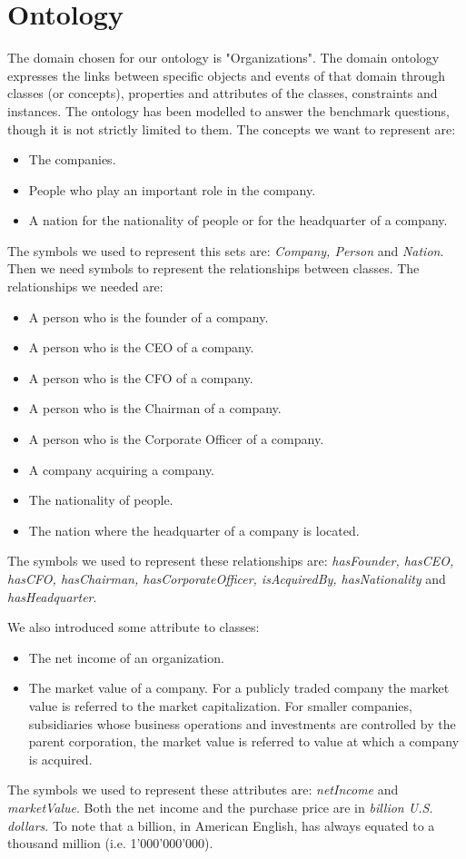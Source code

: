 \section{Ontology}
\label{sec:ontology}
The domain chosen for our ontology is "Organizations". The domain ontology expresses the links between specific objects and events of that domain through classes (or concepts), properties and attributes of the classes, constraints and instances. The ontology has been modelled to answer the benchmark questions, though it is not strictly limited to them.
The concepts we want to represent are:
\begin{itemize}
\item The companies.
\item People who play an important role in the company.
\item A nation for the nationality of people or for the headquarter of a company.
\end{itemize}
The symbols we used to represent this sets are: \textit{Company, Person} and \textit{Nation}.
Then we need symbols to represent the relationships between classes. The relationships we needed are:
\begin{itemize}
\item A person who is the founder of a company.
\item A person who is the CEO of a company.
\item A person who is the CFO of a company.
\item A person who is the Chairman of a company.
\item A person who is the Corporate Officer of a company.
\item A company acquiring a company.
\item The nationality of people.
\item The nation where the headquarter of a company is located.
\end{itemize}
The symbols we used to represent these relationships are: \textit{hasFounder, hasCEO, hasCFO, hasChairman, hasCorporateOfficer, isAcquiredBy, hasNationality} and \textit{hasHeadquarter}. 

We also introduced some attribute to classes:
\begin{itemize}
\item The net income of an organization.
\item The market value of a company. For a publicly traded company the market
value is referred to the market capitalization. For smaller companies, subsidiaries whose business operations and investments are controlled by the parent corporation, the market value is referred to value at which a company is acquired.
\end{itemize}
The symbols we used to represent these attributes are: \textit{ netIncome} and \textit{marketValue}.
Both the net income and the purchase price are in \textit{billion U.S. dollars}. To note that a billion, in American English, has always equated to a thousand million (i.e. 1'000'000'000).

